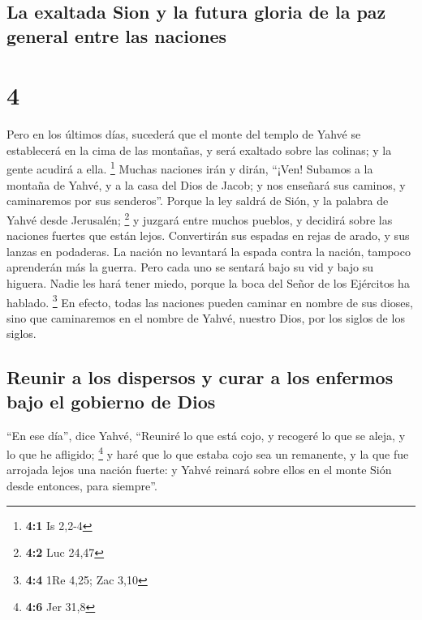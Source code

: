 \hypertarget{la-exaltada-sion-y-la-futura-gloria-de-la-paz-general-entre-las-naciones}{%
\subsection{La exaltada Sion y la futura gloria de la paz general entre
las
naciones}\label{la-exaltada-sion-y-la-futura-gloria-de-la-paz-general-entre-las-naciones}}

\hypertarget{section-3}{%
\section{4}\label{section-3}}

 Pero en los últimos días, sucederá que el monte del
templo de Yahvé se establecerá en la cima de las montañas, y será
exaltado sobre las colinas; y la gente acudirá a ella. \footnote{\textbf{4:1}
  Is 2,2-4}  Muchas naciones irán y dirán, ``¡Ven! Subamos
a la montaña de Yahvé, y a la casa del Dios de Jacob; y nos enseñará sus
caminos, y caminaremos por sus senderos''. Porque la ley saldrá de Sión,
y la palabra de Yahvé desde Jerusalén; \footnote{\textbf{4:2} Luc 24,47}
 y juzgará entre muchos pueblos, y decidirá sobre las
naciones fuertes que están lejos. Convertirán sus espadas en rejas de
arado, y sus lanzas en podaderas. La nación no levantará la espada
contra la nación, tampoco aprenderán más la guerra.  Pero
cada uno se sentará bajo su vid y bajo su higuera. Nadie les hará tener
miedo, porque la boca del Señor de los Ejércitos ha hablado. \footnote{\textbf{4:4}
  1Re 4,25; Zac 3,10}  En efecto, todas las naciones
pueden caminar en nombre de sus dioses, sino que caminaremos en el
nombre de Yahvé, nuestro Dios, por los siglos de los siglos.

\hypertarget{reunir-a-los-dispersos-y-curar-a-los-enfermos-bajo-el-gobierno-de-dios}{%
\subsection{Reunir a los dispersos y curar a los enfermos bajo el
gobierno de
Dios}\label{reunir-a-los-dispersos-y-curar-a-los-enfermos-bajo-el-gobierno-de-dios}}

 ``En ese día'', dice Yahvé, ``Reuniré lo que está cojo, y
recogeré lo que se aleja, y lo que he afligido; \footnote{\textbf{4:6}
  Jer 31,8}  y haré que lo que estaba cojo sea un
remanente, y la que fue arrojada lejos una nación fuerte: y Yahvé
reinará sobre ellos en el monte Sión desde entonces, para siempre''.

